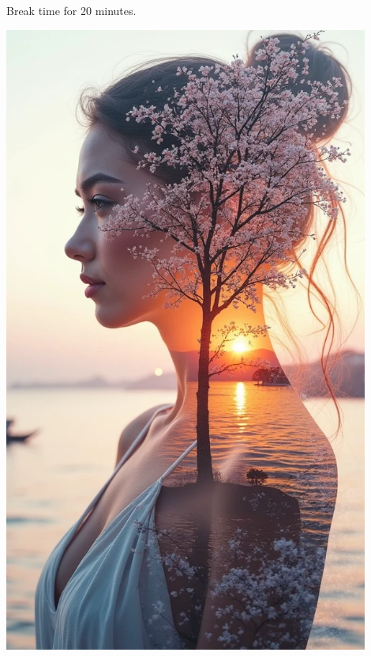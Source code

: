 \documentclass{beamer}
\begin{document}
\begin{frame}
\begin{minipage}{0.5\textwidth}
\begin{center}
\normalsize{Break time for 20 minutes.}
\end{center}
\end{minipage}%
\begin{minipage}{0.5\textwidth}
\begin{center}
\includegraphics[width=0.9\textwidth]{Meaning.png}
\end{center}
\end{minipage}
\end{frame}
\end{document}
